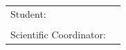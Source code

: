 \pagestyle{fancy}
\setlength{\voffset}{-10pt}
\setlength\headheight{70.0pt}
\renewcommand{\headrulewidth}{0pt}
\cfoot{}
\lfoot{}
\rfoot{}
\begin{center}
	{\department}

	\vspace{4cm}
	\makeThesisTitle %
	~\\~\\

	\makeThesisType

	~\\\vspace{6.5cm}

	\begin{tabular}{p{.3\linewidth}p{.5\linewidth}}
		{\hfill Student:} & {\bf \thesisauthor} \\
		&\\
		{\parbox[t]{\linewidth}{\hfill Scientific Coordinator:}}& {\bf \thesissupervisor}\\
	\end{tabular}

	\vspace{3cm}
	{\bf \thesisyear}
\end{center}
